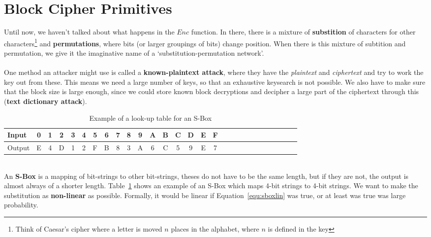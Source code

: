 \section{Block Cipher Primitives}
    Until now, we haven't talked about what happens in the $Enc$ function. In there, there is a mixture of \textbf{substition} of characters for other characters\footnote{Think of Caesar's cipher where a letter is moved $n$ places in the alphabet, where $n$ is defined in the key} and \textbf{permutations}, where bits (or larger groupings of bits) change position. When there is this mixture of subtition and permutation, we give it the imaginative name of a `substitution-permutation network'.\\
    \\
    One method an attacker might use is called a \textbf{known-plaintext attack}, where they have the \textit{plaintext} and \textit{ciphertext} and try to work the key out from these. This means we need a large number of keys, so that an exhaustive keysearch is not possible. We also have to make sure that the block size is large enough, since we could store known block decryptions and decipher a large part of the ciphertext through this (\textbf{text dictionary attack}).\\
    \begin{table}[htp!]
        \centering
        \begin{tabular}{lccccccccccccccccccccccccccc}
            \toprule
            Input & 0 & 1 & 2 & 3 & 4 & 5 & 6 & 7 & 8 & 9 & A & B & C & D  & E & F\\
            \midrule
            Output & E & 4 & D & 1 & 2 & F & B & 8 & 3 & A & 6 & C & 5 & 9 & E & 7\\
            \bottomrule
        \end{tabular}
        \caption{Example of a look-up table for an S-Box}
        \label{fig:lookupsbox}
    \end{table}
    \\
    An \textbf{S-Box} is a mapping of bit-strings to other bit-strings, theses do not have to be the same length, but if they are not, the output is almost always of a shorter length. Table~\ref{fig:lookupsbox} shows an example of an S-Box which maps 4-bit strings to 4-bit strings. We want to make the substitution as \textbf{non-linear} as possible. Formally, it would be linear if Equation~\ref{equ:sboxlin} was true, or at least was true was large probability.
    
